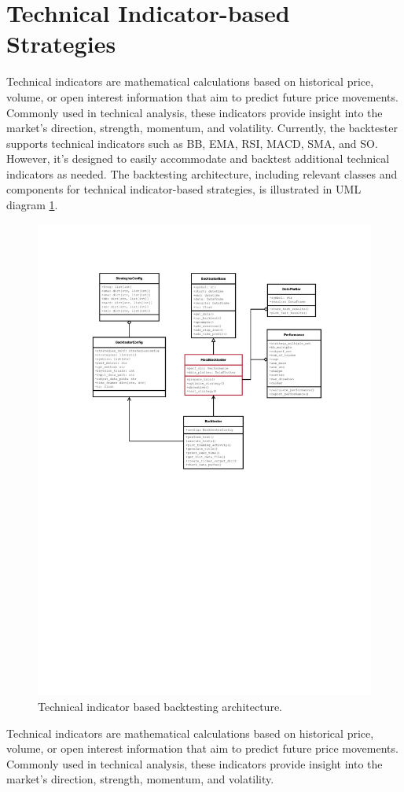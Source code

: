 \section{Technical Indicator-based Strategies}

Technical indicators are mathematical calculations based on historical price, volume, or open interest information that aim to predict future price movements.
Commonly used in technical analysis, these indicators provide insight into the market's direction, strength, momentum, and volatility.
Currently, the backtester supports technical indicators such as BB, EMA, RSI, MACD, SMA, and SO. However, it's designed to easily accommodate and backtest additional technical indicators as needed.
The backtesting architecture, including relevant classes and components for technical indicator-based strategies, is illustrated in UML diagram \ref{fig:tech_indicator_arch}.

\noindent

\begin{figure}[ht!]
\centering
\includegraphics[page=1, trim=30mm 135mm 0 25mm, width=1.1\textwidth, clip]{./uml/backtester_uml.pdf}
\caption{Technical indicator based backtesting architecture.}
\label{fig:tech_indicator_arch}
\end{figure}

\noindent
Technical indicators are mathematical calculations based on historical price, volume, or open interest information that aim to predict future price movements.
Commonly used in technical analysis, these indicators provide insight into the market's direction, strength, momentum, and volatility.